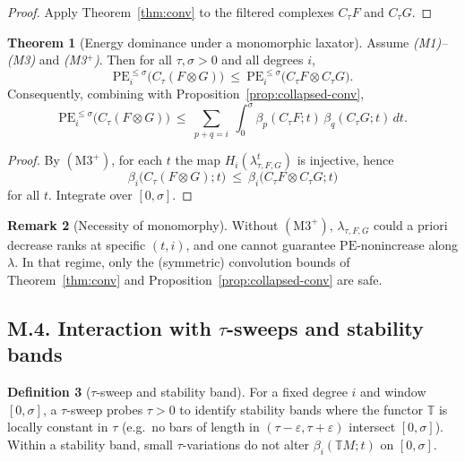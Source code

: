 \documentclass[11pt]{article}
\numberwithin{equation}{section}
\theoremstyle{plain}
\theoremstyle{definition}
\theoremstyle{remark}
\newcommand{\TT}{\mathbb{T}}
\newcommand{\eps}{\varepsilon}
\theoremstyle{plain}
\theoremstyle{definition}
\newcommand{\PE}{\mathrm{PE}}
\newcommand{\betti}{\beta}
\newcommand{\CT}{C_{\tau}}
\numberwithin{equation}{section}
\newtheorem{theorem}{Theorem}[section]
\theoremstyle{definition}
\newtheorem{definition}[theorem]{Definition}
\newtheorem{remark}[theorem]{Remark}
\numberwithin{equation}{section}
\theoremstyle{plain}
\theoremstyle{definition}
\theoremstyle{remark}
\begin{document}
\begin{proof}
Apply Theorem~\ref{thm:conv} to the filtered complexes \(\CT F\) and \(\CT G\).
\end{proof}

\begin{theorem}[Energy dominance under a monomorphic laxator]\label{thm:mono-dominance}
Assume \emph{(M1)--(M3)} and \emph{(M3$^+$)}. Then for all \(\tau,\sigma>0\) and all degrees \(i\),
\[
  \PE_i^{\le \sigma}\big(\CT(F\otimes G)\big)\ \le\ \PE_i^{\le \sigma}\big(\CT F \otimes \CT G\big).
\]
Consequently, combining with Proposition~\ref{prop:collapsed-conv},
\[
  \PE_i^{\le \sigma}\big(\CT(F\otimes G)\big)\ \le\ \sum_{p+q=i}\ \int_0^\sigma \betti_p(\CT F;t)\,\betti_q(\CT G;t)\,dt.
\]
\end{theorem}

\begin{proof}
By \((\mathrm{M3}^+)\), for each \(t\) the map \(H_i(\lambda_{\tau,F,G}^t)\) is injective, hence
\[
  \betti_i\big(\CT(F\otimes G);t\big)\ \le\ \betti_i\big(\CT F\otimes \CT G;t\big)
\]
for all \(t\). Integrate over \([0,\sigma]\).
\end{proof}

\begin{remark}[Necessity of monomorphy]
Without \((\mathrm{M3}^+)\), \(\lambda_{\tau,F,G}\) could a priori decrease ranks at specific \((t,i)\), and one cannot guarantee \(\PE\)-nonincrease along \(\lambda\). In that regime, only the (symmetric) convolution bounds of Theorem~\ref{thm:conv} and Proposition~\ref{prop:collapsed-conv} are safe.
\end{remark}

\bigskip

\subsection*{M.4. Interaction with \texorpdfstring{$\tau$}{tau}-sweeps and stability bands}

\begin{definition}[\(\tau\)-sweep and stability band]
For a fixed degree \(i\) and window \([0,\sigma]\), a \(\tau\)-sweep probes \(\tau>0\) to identify stability bands where the functor \(\TT\) is locally constant in \(\tau\) (e.g.\ no bars of length in \((\tau-\eps,\tau+\eps)\) intersect \([0,\sigma]\)).
Within a stability band, small \(\tau\)-variations do not alter \(\betti_i(\TT M; t)\) on \([0,\sigma]\).
\end{definition}
\end{document}
